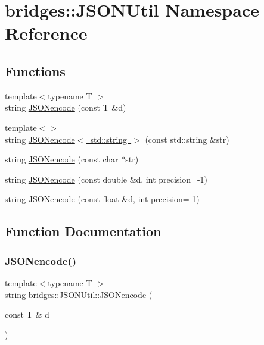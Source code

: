\hypertarget{namespacebridges_1_1_j_s_o_n_util}{}\section{bridges\+:\+:J\+S\+O\+N\+Util Namespace Reference}
\label{namespacebridges_1_1_j_s_o_n_util}
\subsection*{Functions}
\begin{DoxyCompactItemize}
\item 
{\footnotesize template$<$typename T $>$ }\\string \mbox{\hyperlink{namespacebridges_1_1_j_s_o_n_util_aaf500e70dc1b2a9fd1284e386af1be63}{J\+S\+O\+Nencode}} (const T \&d)
\item 
{\footnotesize template$<$$>$ }\\string \mbox{\hyperlink{namespacebridges_1_1_j_s_o_n_util_a2b258507ccdf822ecebbbbb0b66fb06d}{J\+S\+O\+Nencode$<$ std\+::string $>$}} (const std\+::string \&str)
\item 
string \mbox{\hyperlink{namespacebridges_1_1_j_s_o_n_util_a8167097b34730f71a1b395a76eecd550}{J\+S\+O\+Nencode}} (const char $\ast$str)
\item 
string \mbox{\hyperlink{namespacebridges_1_1_j_s_o_n_util_a3ba781fbae468d93158efbdf3492149c}{J\+S\+O\+Nencode}} (const double \&d, int precision=-\/1)
\item 
string \mbox{\hyperlink{namespacebridges_1_1_j_s_o_n_util_a8372aa47b00ae65edbe27747c98d106a}{J\+S\+O\+Nencode}} (const float \&d, int precision=-\/1)
\end{DoxyCompactItemize}


\subsection{Function Documentation}
\mbox{\label{namespacebridges_1_1_j_s_o_n_util_aaf500e70dc1b2a9fd1284e386af1be63}} 
\subsubsection{\texorpdfstring{J\+S\+O\+Nencode()}{JSONencode()}\hspace{0.1cm}{\footnotesize\ttfamily [1/4]}}
{\footnotesize\ttfamily template$<$typename T $>$ \\
string bridges\+::\+J\+S\+O\+N\+Util\+::\+J\+S\+O\+Nencode (\begin{DoxyParamCaption}\item[{const T \&}]{d }\end{DoxyParamCaption})\hspace{0.3cm}{\ttfamily [inline]}}

